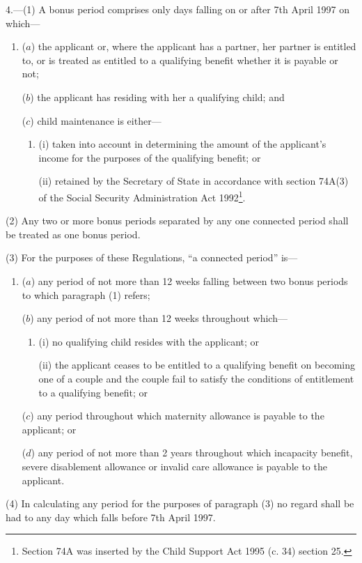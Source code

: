\documentclass[a4paper]{article}
\begin{document}
4.—(1) A bonus period comprises only days falling on or after 7th April 1997 on which—
\begin{enumerate}\item[]
($a$) the applicant or, where the applicant has a partner, her partner is entitled to, or is treated as entitled to a qualifying benefit whether it is payable or not;

($b$) the applicant has residing with her a qualifying child; and

($c$) child maintenance is either—
\begin{enumerate}\item[]
(i) taken into account in determining the amount of the applicant’s income for the purposes of the qualifying benefit; or

(ii) retained by the Secretary of State in accordance with section 74A(3) of the Social Security Administration Act 1992\footnote{\frenchspacing Section 74A was inserted by the Child Support Act 1995 (c. 34) section 25.}.
\end{enumerate}
\end{enumerate}

(2) Any two or more bonus periods separated by any one connected period shall be treated as one bonus period.

(3) For the purposes of these Regulations, “a connected period” is—
\begin{enumerate}\item[]
($a$) any period of not more than 12 weeks falling between two bonus periods to which paragraph (1) refers;

($b$) any period of not more than 12 weeks throughout which—
\begin{enumerate}\item[]
(i) no qualifying child resides with the applicant; or

(ii) the applicant ceases to be entitled to a qualifying benefit on becoming one of a couple and the couple fail to satisfy the conditions of entitlement to a qualifying benefit; or
\end{enumerate}

($c$) any period throughout which maternity allowance is payable to the applicant; or

($d$) any period of not more than 2 years throughout which incapacity benefit, severe disablement allowance or invalid care allowance is payable to the applicant.
\end{enumerate}

(4) In calculating any period for the purposes of paragraph (3) no regard shall be had to any day which falls before 7th April 1997.
\end{document}
